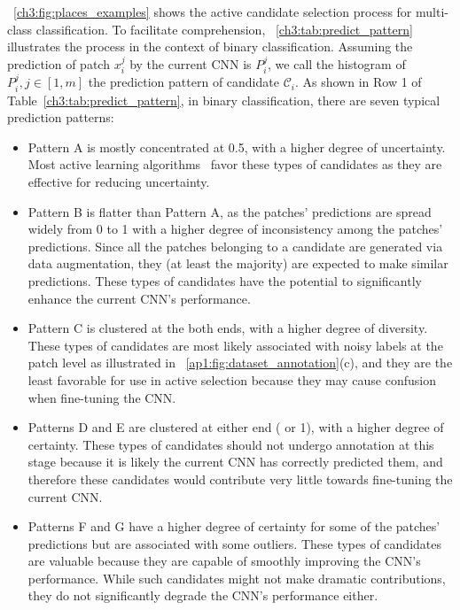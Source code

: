 \figurename~\ref{ch3:fig:places_examples} shows the active candidate selection process for multi-class classification. To facilitate comprehension, \tableautorefname~\ref{ch3:tab:predict_pattern} illustrates the process in the context of binary classification.
Assuming the prediction of patch $x^{j}_i$ by the current CNN is $P_i^{j}$, we call the histogram of $P_i^{j}, j \in [1, m]$ the prediction pattern of candidate $\mathcal{C}_i$. As shown in Row 1 of Table~\ref{ch3:tab:predict_pattern}, in binary classification, there are seven typical prediction patterns:
\begin{itemize}
\item Pattern A is mostly concentrated at 0.5, with a higher degree of uncertainty. Most active learning algorithms~\citep{settles2009active,guyon2011results} favor these types of candidates as they are effective for reducing uncertainty. 
\item Pattern B is flatter than Pattern A, as the patches' predictions are spread widely from 0 to 1 with a higher degree of inconsistency among the patches' predictions. Since all the patches belonging to a candidate are generated via data augmentation, they (at least the majority) are expected to make similar predictions. These types of candidates have the potential to significantly enhance the current CNN's performance.
\item Pattern C is clustered at the both ends, with a higher degree of diversity. These types of candidates are most likely associated with noisy labels at the patch level as illustrated in \figurename~\ref{ap1:fig:dataset_annotation}(c), and they are the least favorable for use in active selection because they may cause confusion when fine-tuning the CNN.
\item Patterns D and E are clustered at either end ( or 1), with a higher degree of certainty. These types of candidates should not undergo annotation at this stage because it is likely the current CNN has correctly predicted them, and therefore these candidates would contribute very little towards fine-tuning the current CNN.
\item Patterns F and G have a higher degree of certainty for some of the patches' predictions but are associated with some outliers. These types of candidates are valuable because they are capable of smoothly improving the CNN's performance.  While such candidates might not make dramatic contributions, they do not significantly degrade the CNN's performance either.
\end{itemize}

